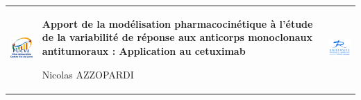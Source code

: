 \thispagestyle{empty}
\setmarginsrb{20mm}{20mm}{25mm}{0mm}{0mm}{0mm}{0mm}{0mm}
\begin{tabular}{ p{3cm} p{9cm} p{3cm}}
		\begin{minipage}{3cm}
			\includegraphics[width=3cm]{./images/pucvl.png} 
		\end{minipage}
	&
		\begin{minipage}{9cm}
			\begin{center}
				\textbf{Apport de la modélisation pharmacocinétique à l'étude de la variabilité de réponse aux anticorps monoclonaux antitumoraux : Application au cetuximab}

Nicolas AZZOPARDI
			\end{center}
		\end{minipage}
	&
		\begin{minipage}{3cm}
			\includegraphics[width=3cm]{./images/ufr.png} 
		\end{minipage}
\end{tabular}
\vspace{1cm}
